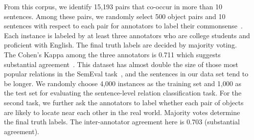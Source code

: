 From this corpus, we identify 15,193 pairs that co-occur in more than 10 sentences.
Among these pairs, we randomly select 500 object pairs and 
10 sentences with respect to each pair for annotators to label their commonsense~\lnear. 
Each instance is labeled by at least three annotators who are college students
and proficient with English. 
The final truth labels are decided by majority voting. 
The Cohen's Kappa among the three annotators is 0.711 which suggests substantial agreement~\cite{Landis1977TheMO}. 
This dataset has almost double the size of those most
popular relations in the SemEval task~\cite{sem}, and the sentences in our
data set tend to be longer.
{We randomly choose 4,000 instances as the training set and 1,000 as the test set for evaluating the sentence-level relation classification task.}
For the second task, we further ask the annotators to label whether each pair of objects are likely to locate near each other in the real world. 
Majority votes determine the final truth labels.
The inter-annotator agreement here is {0.703} (substantial agreement).  
